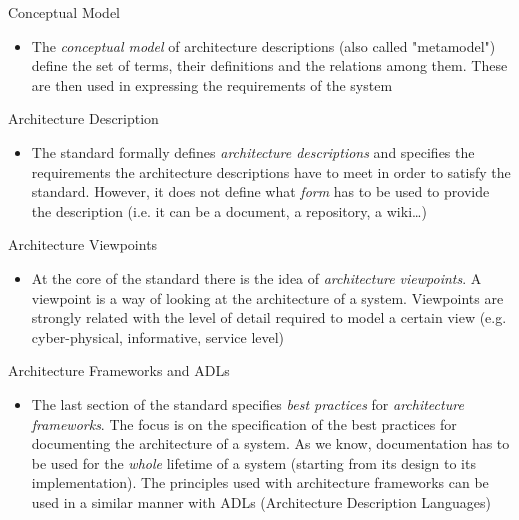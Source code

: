 		\begin{frame}
			
		\vspace{0.3cm}
		
			\begin{block}{Conceptual Model}
				\begin{itemize}
					\item The \emph{conceptual model} of architecture descriptions (also called "metamodel") define the set of terms, their definitions and the relations among them. These are then used in expressing the requirements of the system
				\end{itemize}
			\end{block}				
			
\vspace{0.3cm}			
			
			\begin{block}{Architecture Description}
				\begin{itemize}
					\item The standard formally defines \emph{architecture descriptions} and specifies the requirements the architecture descriptions have to meet in order to satisfy the standard. However, it does not define what \emph{form} has to be used to provide the description (i.e. it can be a document, a repository, a wiki\dots)
				\end{itemize}
			\end{block}
		\end{frame}
		
		\begin{frame}					
			
			\begin{block}{Architecture Viewpoints}
			\begin{itemize}
				\item At the core of the standard there is the idea of \emph{architecture viewpoints}. A viewpoint is a way of looking at the architecture of a system. Viewpoints are strongly related with the level of detail required to model a certain view (e.g. cyber-physical, informative, service level)
				\end{itemize}
			\end{block}
				
			\begin{block}{Architecture Frameworks and ADLs}
				\begin{itemize}
					\item The last section of the standard specifies \emph{best practices} for \emph{architecture frameworks}.\newline
					The focus is on the specification of the best practices for documenting the architecture of a system. As we know, documentation has to be used for the \emph{whole} lifetime of a system (starting from its design to its implementation).\newline
					The principles used with architecture frameworks can be used in a similar manner with ADLs (Architecture Description Languages)
				\end{itemize}
			
			\end{block}
		\end{frame}
		
